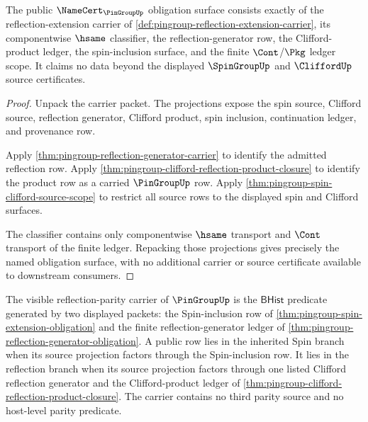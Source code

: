 \begin{theorem}
\label{thm:pingroup-namecert-obligation-surface}
The public $\NameCert_{\PinGroupUp}$ obligation surface consists exactly of
the reflection-extension carrier of
\autoref{def:pingroup-reflection-extension-carrier}, its componentwise
$\hsame$ classifier, the reflection-generator row, the Clifford-product ledger,
the spin-inclusion surface, and the finite $\Cont$/$\Pkg$ ledger scope. It
claims no data beyond the displayed $\SpinGroupUp$ and $\CliffordUp$ source
certificates.
\end{theorem}
\begin{proof}
Unpack the carrier packet. The projections expose the spin source, Clifford
source, reflection generator, Clifford product, spin inclusion, continuation
ledger, and provenance row.

Apply \autoref{thm:pingroup-reflection-generator-carrier} to identify the
admitted reflection row. Apply
\autoref{thm:pingroup-clifford-reflection-product-closure} to identify the
product row as a carried $\PinGroupUp$ row. Apply
\autoref{thm:pingroup-spin-clifford-source-scope} to restrict all source rows
to the displayed spin and Clifford surfaces.

The classifier contains only componentwise $\hsame$ transport and $\Cont$
transport of the finite ledger. Repacking those projections gives precisely
the named obligation surface, with no additional carrier or source certificate
available to downstream consumers.
\end{proof}

\begin{definition}
\label{def:pingroup-reflection-parity-carrier}
The visible reflection-parity carrier of $\PinGroupUp$ is the
$\mathsf{BHist}$ predicate generated by two displayed packets: the
Spin-inclusion row of \autoref{thm:pingroup-spin-extension-obligation} and
the finite reflection-generator ledger of
\autoref{thm:pingroup-reflection-generator-obligation}. A public row lies in
the inherited Spin branch when its source projection factors through the
Spin-inclusion row. It lies in the reflection branch when its source
projection factors through one listed Clifford reflection generator and the
Clifford-product ledger of
\autoref{thm:pingroup-clifford-reflection-product-closure}. The carrier
contains no third parity source and no host-level parity predicate.
\end{definition}

